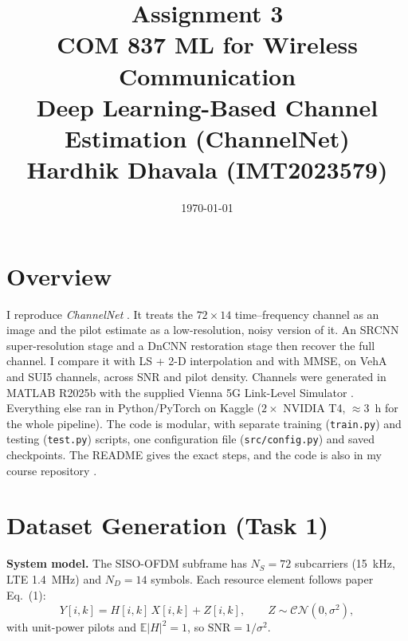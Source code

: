\documentclass[a4paper,10pt]{article}
\title{\vspace{-2 cm}\Huge\textbf{Assignment 3} \\
    \vspace{0.5cm}\normalsize COM 837 ML for Wireless Communication \\
    \normalsize Deep Learning-Based Channel Estimation (ChannelNet) \\
    \normalsize Hardhik Dhavala (IMT2023579) \\
    }
\date{\vspace{-1cm}\today}
\begin{document}
\maketitle
\thispagestyle{fancy}
\vspace{-0.4cm}

\section{Overview}
I reproduce \textit{ChannelNet} \cite{soltani2019}. It treats the $72\times14$ time--frequency channel as an image and the pilot estimate as a low-resolution, noisy version of it. An SRCNN \cite{dong2016} super-resolution stage and a DnCNN \cite{zhang2017} restoration stage then recover the full channel. I compare it with LS + 2-D interpolation and with MMSE, on VehA and SUI5 channels, across SNR and pilot density. Channels were generated in MATLAB R2025b with the supplied Vienna 5G Link-Level Simulator \cite{vienna}. Everything else ran in Python/PyTorch on Kaggle ($2\times$ NVIDIA T4, $\approx$3~h for the whole pipeline). The code is modular, with separate training (\texttt{train.py}) and testing (\texttt{test.py}) scripts, one configuration file (\texttt{src/config.py}) and saved checkpoints. The README gives the exact steps, and the code is also in my course repository \cite{github}.

\section{Dataset Generation (Task 1)}
\textbf{System model.} The SISO-OFDM subframe has $N_S=72$ subcarriers (15~kHz, LTE 1.4~MHz) and $N_D=14$ symbols. Each resource element follows paper Eq.~(1):
\begin{equation}
    Y[i,k] = H[i,k]\,X[i,k] + Z[i,k], \qquad Z\sim\mathcal{CN}(0,\sigma^2),
    \label{eq:sysmodel}
\end{equation}
with unit-power pilots and $\mathbb{E}|H|^2=1$, so $\text{SNR}=1/\sigma^2$.
\end{document}
